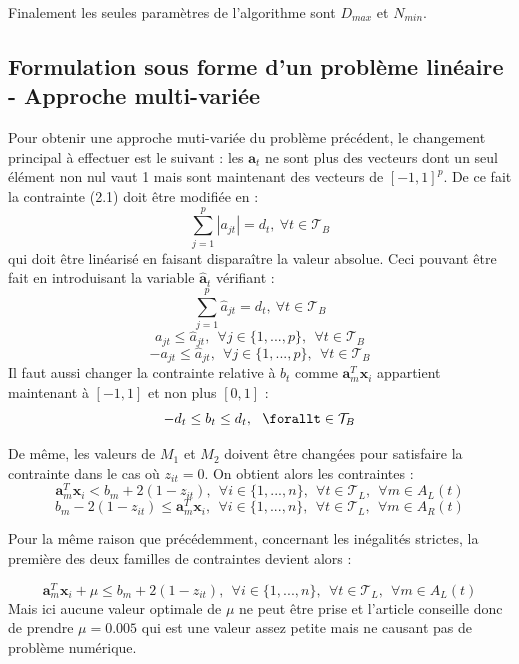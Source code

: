 \documentclass[12pt]{report}
\begin{document}
Finalement les seules paramètres de l'algorithme sont \(D_{max}\) et \(N_{min}\).

\subsection{Formulation sous forme d'un problème linéaire - Approche multi-variée}
Pour obtenir une approche muti-variée du problème précédent, le changement principal à effectuer est le suivant : les \(\mathbf{a}_t\) ne sont plus des vecteurs dont un seul élément non nul vaut 1 mais sont maintenant des vecteurs de \([-1,1]^p \). De ce fait la contrainte (2.1) doit être modifiée en :
\[\sum_{j=1}^p |a_{jt}|=d_t,~ \forall t \in \mathcal{T}_B \]
qui doit être linéarisé en faisant disparaître la valeur absolue. Ceci pouvant être fait en introduisant la variable \(\hat{\mathbf{a}}_t\) vérifiant :
\[\sum_{j=1}^p \hat{a}_{jt}=d_t,~ \forall t \in \mathcal{T}_B \]
\[a_{jt} \leq \hat{a}_{jt},~~ \forall j \in \{1,...,p\},~~ \forall t \in \mathcal{T}_B\]
\[-a_{jt} \leq \hat{a}_{jt},~~ \forall j \in \{1,...,p\},~~ \forall t \in \mathcal{T}_B\]
Il faut aussi changer la contrainte relative à \(b_t\) comme \(\mathbf{a}_m^T\mathbf{x}_i\) appartient maintenant à \([-1,1]\) et non plus \([0,1]\) :
\[
-d_t \leq b_t \leq d_t, ~~ \forallt \in \mathcal{T}_B
\]

De même, les valeurs de \(M_1\) et \(M_2\) doivent être changées pour satisfaire la contrainte dans le cas où \(z_{it}=0\). On obtient alors les contraintes :
\[
    \mathbf{a}_m^T\mathbf{x}_i < b_m + 2(1-z_{it}),~~ \forall i \in \{1,...,n\},~~ \forall t \in \mathcal{T}_L,~~ \forall m \in A_L(t)
\]
\[
    b_m - 2(1-z_{it}) \leq \mathbf{a}_m^T\mathbf{x}_i ,~~ \forall i \in \{1,...,n\},~~ \forall t \in \mathcal{T}_L,~~ \forall m \in A_R(t)
\]

Pour la même raison que précédemment, concernant les inégalités strictes, la première des deux familles de contraintes devient alors :

\[
    \mathbf{a}_m^T\mathbf{x}_i + \mu \leq b_m + 2(1-z_{it}),~~ \forall i \in \{1,...,n\},~~ \forall t \in \mathcal{T}_L,~~ \forall m \in A_L(t)
\]
Mais ici aucune valeur optimale de \(\mu\) ne peut être prise et l'article conseille donc de prendre \(\mu=0.005\) qui est une valeur assez petite mais ne causant pas de problème numérique.\\
\vspace{0.5cm}
\end{document}
